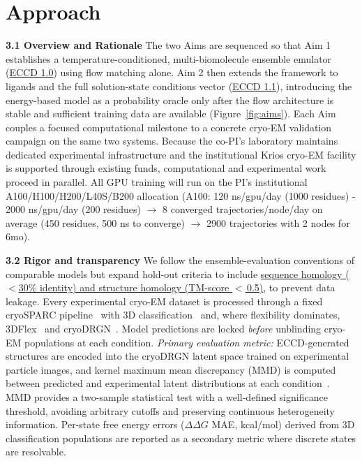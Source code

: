\documentclass[11pt]{article}
\newcommand{\ECCD}{ECCD\xspace}
\begin{document}
\section{Approach}


\textbf{3.1 Overview and Rationale} The two Aims are sequenced so that Aim 1 establishes a temperature-conditioned, multi-biomolecule ensemble emulator (\uline{\ECCD 1.0}) using flow matching alone. Aim 2 then extends the framework to ligands and the full solution-state conditions vector (\uline{\ECCD 1.1}), introducing the energy-based model as a probability oracle only after the flow architecture is stable and sufficient training data are available (Figure~\ref{fig:aims}). Each Aim couples a focused computational milestone to a concrete cryo-EM validation campaign on the same two systems. Because the co-PI's laboratory maintains dedicated experimental infrastructure and the institutional Krios cryo-EM facility is supported through existing funds, computational and experimental work proceed in parallel. All GPU training will run on the PI's institutional A100/H100/H200/L40S/B200 allocation (A100: 120  ns/gpu/day (1000 residues) - 2000 ns/gpu/day (200 residues) $\rightarrow$  8 converged trajectories/node/day on average (450 residues, 500 ns to converge) $\rightarrow$ 2900 trajectories with 2 nodes for 6mo).

\textbf{3.2 Rigor and transparency} We follow the ensemble-evaluation conventions of comparable models but expand hold-out criteria to include \uline{sequence homology ($<$30\% identity) and structure homology (TM-score $<$\,0.5)}, to prevent data leakage. Every experimental cryo-EM dataset is processed through a fixed cryoSPARC pipeline~\cite{punjani_cryoSPARC_2017} with 3D classification~\cite{punjani_3DVA_2021} and, where flexibility dominates, 3DFlex~\cite{punjani_3DFlex_2023} and cryoDRGN~\cite{zhong_CryoDRGN_2021}. Model predictions are locked \emph{before} unblinding cryo-EM populations at each condition. \emph{Primary evaluation metric:} ECCD-generated structures are encoded into the cryoDRGN latent space trained on experimental particle images, and kernel maximum mean discrepancy (MMD) is computed between predicted and experimental latent distributions at each condition~\cite{zhong_CryoDRGN_2021}. MMD provides a two-sample statistical test with a well-defined significance threshold, avoiding arbitrary cutoffs and preserving continuous heterogeneity information. Per-state free energy errors ($\Delta\Delta G$ MAE, kcal/mol) derived from 3D classification populations are reported as a secondary metric where discrete states are resolvable.
\end{document}
